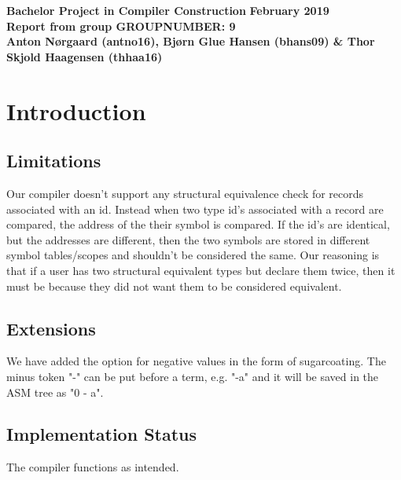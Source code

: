 \documentclass{article}
\begin{document}
\thispagestyle{empty}

\begin{center}
{\LARGE\bf Bachelor Project in Compiler Construction}
{\LARGE\bf February 2019}
\\[10ex]
{\Large\bf Report from group GROUPNUMBER: 9 }
\\[2ex]
{\Large\bf Anton Nørgaard (antno16), Bjørn Glue Hansen (bhans09) \& Thor Skjold Haagensen (thhaa16)}
\end{center}

\setcounter{page}{0}

\newpage

\section{Introduction}


\subsection{Limitations}
Our compiler doesn't support any structural equivalence check for records associated with an id. Instead when two type id's associated with a record are compared, the address of the their symbol is compared. If the id's are identical, but the addresses are different, then the two symbols are stored in different symbol tables/scopes and shouldn't be considered the same. Our reasoning is that if a user has two structural equivalent types but declare them twice, then it must be because they did not want them to be considered equivalent.

\subsection{Extensions}
We have added the option for negative values in the form of sugarcoating. The minus token "-" can be put before a term, e.g. "-a" and it will be saved in the ASM tree as "0 - a". 

\subsection{Implementation Status}
The compiler functions as intended. 
\end{document}
